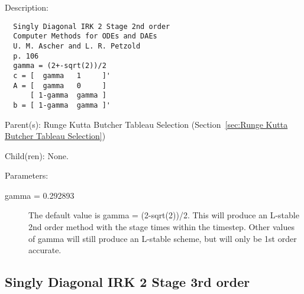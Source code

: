 \begin{list}{}
  {\setlength{\leftmargin}{1.0in}
   \setlength{\labelwidth}{0.75in}
   \setlength{\labelsep}{0.125in}}
  \item[Description:]
\begin{verbatim}
  Singly Diagonal IRK 2 Stage 2nd order
  Computer Methods for ODEs and DAEs
  U. M. Ascher and L. R. Petzold
  p. 106
  gamma = (2+-sqrt(2))/2
  c = [  gamma   1     ]'
  A = [  gamma   0     ]
      [ 1-gamma  gamma ]
  b = [ 1-gamma  gamma ]'
\end{verbatim}
  \item[Parent(s):]
    Runge Kutta Butcher Tableau Selection (Section~\ref{sec:Runge Kutta Butcher Tableau Selection})
  \item[Child(ren):]
    None. 
  \item[Parameters:]
    \begin{description}
      \item[gamma = 0.292893] 
The default value is gamma = (2-sqrt(2))/2. This will produce an L-stable 2nd order method with the stage times within the timestep.  Other values of gamma will still produce an L-stable scheme, but will only be 1st order accurate.
\end{description}

\end{list}

\subsection{Singly Diagonal IRK 2 Stage 3rd order}
\label{sec:Singly Diagonal IRK 2 Stage 3rd order}


